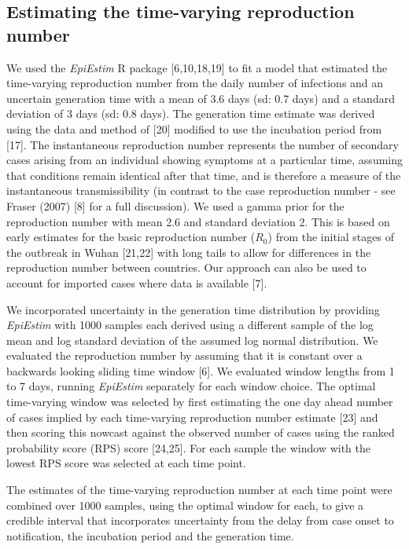 \documentclass[]{article}
\begin{document}
\hypertarget{estimating-the-time-varying-reproduction-number}{%
\subsection{Estimating the time-varying reproduction
number}\label{estimating-the-time-varying-reproduction-number}}

We used the \emph{EpiEstim} R package {[}6,10,18,19{]} to fit a model
that estimated the time-varying reproduction number from the daily
number of infections and an uncertain generation time with a mean of 3.6
days (sd: 0.7 days) and a standard deviation of 3 days (sd: 0.8 days).
The generation time estimate was derived using the data and method of
{[}20{]} modified to use the incubation period from {[}17{]}. The
instantaneous reproduction number represents the number of secondary
cases arising from an individual showing symptoms at a particular time,
assuming that conditions remain identical after that time, and is
therefore a measure of the instantaneous transmissibility (in contrast
to the case reproduction number - see Fraser (2007) {[}8{]} for a full
discussion). We used a gamma prior for the reproduction number with mean
2.6 and standard deviation 2. This is based on early estimates for the
basic reproduction number (\(R_0\)) from the initial stages of the
outbreak in Wuhan {[}21,22{]} with long tails to allow for differences
in the reproduction number between countries. Our approach can also be
used to account for imported cases where data is available {[}7{]}.

We incorporated uncertainty in the generation time distribution by
providing \emph{EpiEstim} with 1000 samples each derived using a
different sample of the log mean and log standard deviation of the
assumed log normal distribution. We evaluated the reproduction number by
assuming that it is constant over a backwards looking sliding time
window {[}6{]}. We evaluated window lengths from 1 to 7 days, running
\emph{EpiEstim} separately for each window choice. The optimal
time-varying window was selected by first estimating the one day ahead
number of cases implied by each time-varying reproduction number
estimate {[}23{]} and then scoring this nowcast against the observed
number of cases using the ranked probability score (RPS) score
{[}24,25{]}. For each sample the window with the lowest RPS score was
selected at each time point.

The estimates of the time-varying reproduction number at each time point
were combined over 1000 samples, using the optimal window for each, to
give a credible interval that incorporates uncertainty from the delay
from case onset to notification, the incubation period and the
generation time.
\end{document}
